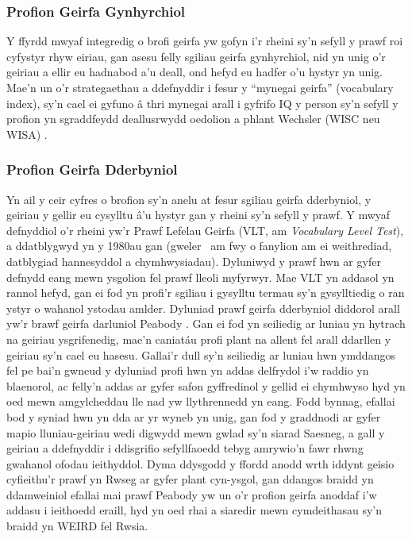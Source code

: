 \subsubsection{Profion Geirfa Gynhyrchiol}
Y ffyrdd mwyaf integredig o brofi geirfa yw gofyn i'r rheini sy'n sefyll y prawf roi cyfystyr rhyw eiriau, gan asesu felly sgiliau geirfa gynhyrchiol, nid yn unig o'r geiriau a ellir eu hadnabod a'u deall, ond hefyd eu hadfer o'u hystyr yn unig. Mae'n un o'r strategaethau a ddefnyddir i fesur y ``mynegai geirfa'' (vocabulary index), sy'n cael ei gyfuno â thri mynegai arall i gyfrifo IQ y person sy'n sefyll y profion yn sgraddfeydd deallusrwydd oedolion a phlant Wechsler (WISC neu WISA) \parencite{wechsler_wechsler_nodate}.

\subsubsection{Profion Geirfa Dderbyniol}
Yn ail y ceir cyfres o brofion sy'n anelu at fesur sgiliau geirfa dderbyniol, y geiriau y gellir eu cysylltu â'u hystyr gan y rheini sy'n sefyll y prawf. Y mwyaf defnyddiol o'r rheini yw'r Prawf Lefelau Geirfa (VLT, am \textit{Vocabulary Level Test}), a ddatblygwyd yn y 1980au gan \textcite{nation_teaching_1990} (gweler~\cite{kremmel_vocabulary_2017} am fwy o fanylion am ei weithrediad, datblygiad hannesyddol a chymhwysiadau). Dyluniwyd y prawf hwn ar gyfer defnydd eang mewn ysgolion fel prawf lleoli  myfyrwyr. Mae VLT yn addasol yn rannol hefyd, gan ei fod yn profi'r sgiliau i gysylltu termau sy'n gysylltiedig o ran ystyr o wahanol ystodau amlder. Dyluniad prawf geirfa dderbyniol diddorol arall yw'r brawf geirfa darluniol Peabody \parencite{dunn_ppvt-4_nodate}. Gan ei fod yn seiliedig ar luniau yn hytrach na geiriau ysgrifenedig, mae'n caniatáu profi plant na allent fel arall ddarllen y geiriau sy'n cael eu hasesu. Gallai'r dull sy'n seiliedig ar luniau hwn ymddangos fel pe bai'n gwneud y dyluniad profi hwn yn addas delfrydol i'w raddio yn blaenorol, ac felly'n addas ar gyfer safon gyffredinol y gellid ei chymhwyso hyd yn oed mewn amgylcheddau lle nad yw llythrennedd yn eang. Fodd bynnag, efallai bod y syniad hwn yn dda ar yr wyneb yn unig, gan fod y graddnodi ar gyfer mapio lluniau-geiriau wedi digwydd mewn gwlad sy'n siarad Saesneg, a gall y geiriau a ddefnyddir i ddisgrifio sefyllfaoedd tebyg amrywio'n fawr rhwng gwahanol ofodau ieithyddol. Dyma ddysgodd \textcite{kartushina_use_2022} y ffordd anodd wrth iddynt geisio cyfieithu'r prawf yn Rwseg ar gyfer plant cyn-ysgol, gan ddangos braidd yn ddamweiniol efallai mai prawf Peabody yw un o'r profion geirfa anoddaf i'w addasu i ieithoedd eraill, hyd yn oed rhai a siaredir mewn cymdeithasau sy'n braidd yn WEIRD fel Rwsia.

